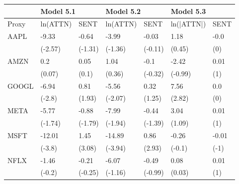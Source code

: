 \begin{tabular}{lllllll}
\toprule
{} & \multicolumn{2}{l}{Model 5.1} & \multicolumn{2}{l}{Model 5.2} & \multicolumn{2}{l}{Model 5.3} \\
\midrule
Proxy &  ln(ATTN) &     SENT &  ln(ATTN) &     SENT &  ln(|ATTN|) &   SENT \\
AAPL  &     -9.33 &    -0.64 &     -3.99 &    -0.03 &        1.18 &   -0.0 \\
      &   (-2.57) &  (-1.31) &   (-1.36) &  (-0.11) &      (0.45) &    (0) \\
AMZN  &       0.2 &     0.05 &      1.04 &     -0.1 &       -2.42 &   0.01 \\
      &    (0.07) &    (0.1) &    (0.36) &  (-0.32) &     (-0.99) &    (1) \\
GOOGL &     -6.94 &     0.81 &     -5.56 &     0.32 &        7.56 &    0.0 \\
      &    (-2.8) &   (1.93) &   (-2.07) &   (1.25) &      (2.82) &    (0) \\
META  &     -5.77 &    -0.88 &     -7.99 &    -0.44 &        3.04 &   0.01 \\
      &   (-1.74) &  (-1.79) &   (-1.94) &  (-1.39) &      (1.09) &    (1) \\
MSFT  &    -12.01 &     1.45 &    -14.89 &     0.86 &       -0.26 &  -0.01 \\
      &    (-3.8) &   (3.08) &   (-3.94) &   (2.93) &      (-0.1) &   (-1) \\
NFLX  &     -1.46 &    -0.21 &     -6.07 &    -0.49 &        0.08 &   0.01 \\
      &    (-0.2) &  (-0.25) &   (-1.16) &  (-0.99) &      (0.03) &    (1) \\
\bottomrule
\end{tabular}
